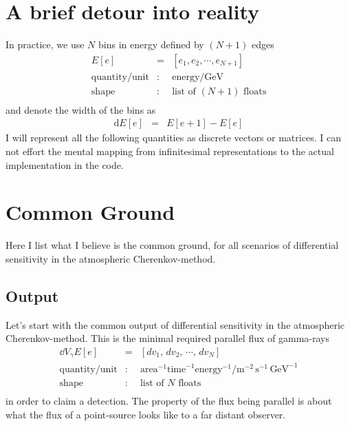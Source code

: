 \documentclass{article}%
\begin{document}
    \section{A brief detour into reality}
        In practice, we use $N$ bins in energy defined by $(N+1)$ edges
        \begin{eqnarray*}
            E[e] &=& [e_1, e_2, \cdots, e_{N+1}]\\
            \text{quantity}/\text{unit} &:& \text{energy} / \text{GeV}\\
            \text{shape} &:& \text{list of}\,\,(N + 1)\,\,\text{floats}\\
        \end{eqnarray*}
        and denote the width of the bins as
        \begin{eqnarray*}
            \text{d}E[e] &=& E[e+1] - E[e]
        \end{eqnarray*}
        I will represent all the following quantities as discrete vectors or matrices.
        I can not effort the mental mapping from infinitesimal representations to the actual implementation in the code.
    \section{Common Ground}
        \label{SecCommonGround}
        Here I list what I believe is the common ground, for all scenarios of differential sensitivity in the atmospheric Cherenkov-method.
        \subsection{Output}
            Let's start with the common output of differential sensitivity in the atmospheric Cherenkov-method.
            This is the minimal required parallel flux of gamma-rays
            \begin{eqnarray*}
                \dd{V_\gamma}{E}[e] &=& [dv_1, \, dv_2, \, \cdots, \, dv_N]\\
                \text{quantity}/\text{unit} &:& \text{area}^{-1} \text{time}^{-1} \text{energy}^{-1} / \text{m}^{-2}\,\text{s}^{-1}\,\text{GeV}^{-1}\\
                \text{shape} &:& \text{list of}\,\,N\,\,\text{floats}\\
            \end{eqnarray*}
            in order to claim a detection.
            The property of the flux being parallel is about what the flux of a point-source looks like to a far distant observer.
\end{document}
